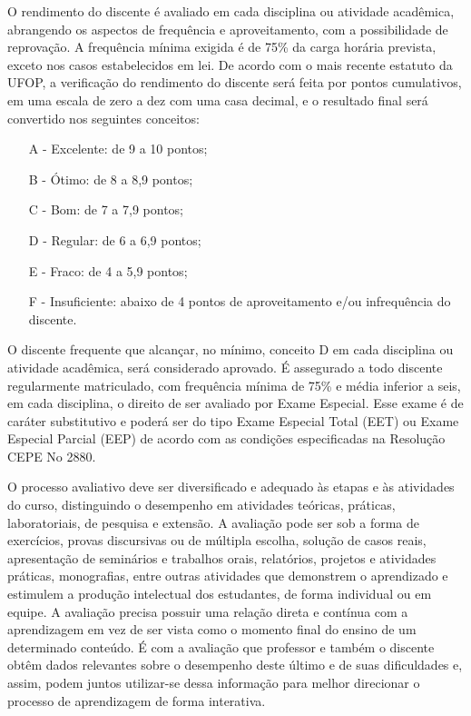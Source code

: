 \documentclass[
	12pt,				%
	openright,			%
	oneside,			%
	a4paper,			%
	english,			%
	brazil				%
	]{abntex2}
\begin{document}
O rendimento do discente é avaliado em cada disciplina ou atividade acadêmica, abrangendo os aspectos de frequência e aproveitamento, com a possibilidade de reprovação. A frequência mínima exigida é de 75\% da carga horária prevista, exceto nos casos estabelecidos em lei. De acordo com o mais recente estatuto da UFOP, a verificação do rendimento do discente será feita por pontos cumulativos, em uma escala de zero a dez com uma casa decimal, e o resultado final será convertido nos seguintes conceitos:

\begin{itemize}
\item[A -] Excelente: de 9 a 10 pontos;
\item[B -] Ótimo: de 8 a 8,9 pontos;
\item[C -] Bom: de 7 a 7,9 pontos;
\item[D -] Regular: de 6 a 6,9 pontos;
\item[E -] Fraco: de 4 a 5,9 pontos;
\item[F -] Insuficiente: abaixo de 4 pontos de aproveitamento e/ou infrequência do discente.
\end{itemize}

O discente frequente que alcançar, no mínimo, conceito D em cada disciplina ou atividade acadêmica, será considerado aprovado. É assegurado a todo discente regularmente matriculado, com frequência mínima de 75\% e média inferior a seis, em cada disciplina, o direito de ser avaliado por Exame Especial. Esse exame é de caráter substitutivo e poderá ser do tipo Exame Especial Total (EET) ou Exame Especial Parcial (EEP) de acordo com as condições especificadas na Resolução CEPE No 2880.

O processo avaliativo deve ser diversificado e adequado às etapas e às atividades do curso, distinguindo o desempenho em atividades teóricas, práticas, laboratoriais, de pesquisa e extensão. A avaliação pode ser sob a forma de exercícios, provas discursivas ou de múltipla escolha, solução de casos reais, apresentação de seminários e trabalhos orais, relatórios, projetos e atividades práticas, monografias, entre outras atividades que demonstrem o aprendizado e estimulem a produção intelectual dos estudantes, de forma individual ou em equipe.
A avaliação precisa possuir uma relação direta e contínua com a aprendizagem em vez de ser vista como o momento final do ensino de um determinado conteúdo. É com a avaliação que professor e também o discente obtêm dados relevantes sobre o desempenho deste último e de suas dificuldades e, assim, podem juntos utilizar-se dessa informação para melhor direcionar o processo de aprendizagem de forma interativa.
\end{document}
